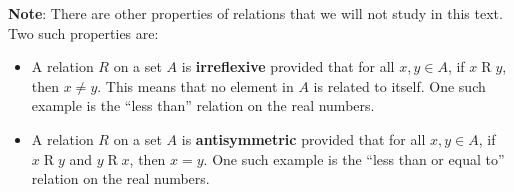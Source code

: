 \documentclass[11pt]{article}
\begin{document}
\noindent
\textbf{Note}:  There are other properties of relations that we will not study in this text.  Two such properties are:

\begin{itemize}
  \item A relation $R$ on a set $A$ is \textbf{irreflexive} provided that for all $x, y \in A$, if $x \mathrel{R} y$, then $x \ne y$.  This means that no element in $A$ is related to itself.  One such example is the ``less than'' relation on the real numbers.
  \item A relation $R$ on a set $A$ is \textbf{antisymmetric} provided that for all $x, y \in A$, if $x \mathrel{R} y$ and $y \mathrel{R} x$, then $x = y$.    One such example is the ``less than or equal to'' relation on the real numbers.
\end{itemize}

%
%
%
%
%
%
\hbreak
\end{document}
